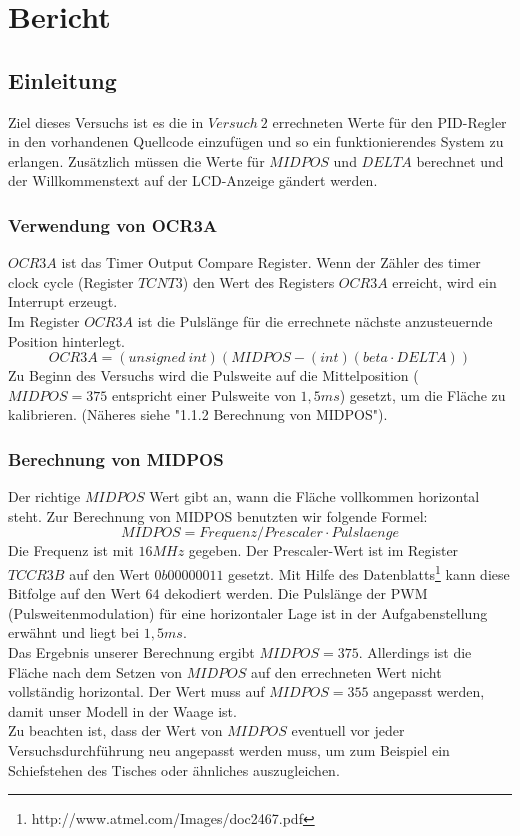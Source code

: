 \section{Bericht}

\subsection{Einleitung}
Ziel dieses Versuchs ist es die in $Versuch\ 2$ errechneten Werte für den PID-Regler in den vorhandenen Quellcode einzufügen und so ein funktionierendes System zu erlangen. Zusätzlich müssen die Werte für $MIDPOS$ und $DELTA$ berechnet und der Willkommenstext auf der LCD-Anzeige gändert werden. 

\subsubsection{Verwendung von OCR3A}
$OCR3A$ ist das Timer Output Compare Register. Wenn der Zähler des timer clock cycle (Register $TCNT3$) den Wert des Registers $OCR3A$ erreicht, wird ein Interrupt erzeugt. \\
Im Register $OCR3A$ ist die Pulslänge für die errechnete nächste anzusteuernde Position hinterlegt.\\
\begin{equation}
OCR3A = (unsigned\ int) (MIDPOS - (int)(beta \cdot DELTA))
\end{equation}
Zu Beginn des Versuchs wird die Pulsweite auf die Mittelposition ($MIDPOS=375$ entspricht einer Pulsweite von $1,5ms$) gesetzt, um die Fläche zu kalibrieren. (Näheres siehe "1.1.2 Berechnung von MIDPOS").

\subsubsection{Berechnung von MIDPOS}
Der richtige $MIDPOS$ Wert gibt an, wann die Fläche vollkommen horizontal steht. Zur Berechnung von MIDPOS benutzten wir folgende Formel: \\
\begin{equation}
MIDPOS  = Frequenz / Prescaler \cdot Pulslaenge
\end{equation}
Die Frequenz ist mit $16 MHz$ gegeben. Der Prescaler-Wert ist im Register $TCCR3B$ auf den Wert $0b00000011$ gesetzt. Mit Hilfe des Datenblatts\footnote{http://www.atmel.com/Images/doc2467.pdf} kann diese Bitfolge auf den Wert $64$ dekodiert werden. Die Pulslänge der PWM (Pulsweitenmodulation) für eine horizontaler Lage ist in der Aufgabenstellung erwähnt und liegt bei $1,5 ms$.\\
Das Ergebnis unserer Berechnung ergibt $MIDPOS = 375$. Allerdings ist die Fläche nach dem Setzen von $MIDPOS$ auf den errechneten Wert nicht vollständig horizontal. Der Wert muss auf $MIDPOS = 355$ angepasst werden, damit unser Modell in der Waage ist. \\ 
Zu beachten ist, dass der Wert von $MIDPOS$ eventuell vor jeder Versuchsdurchführung neu angepasst werden muss, um zum Beispiel ein Schiefstehen des Tisches oder ähnliches auszugleichen.

